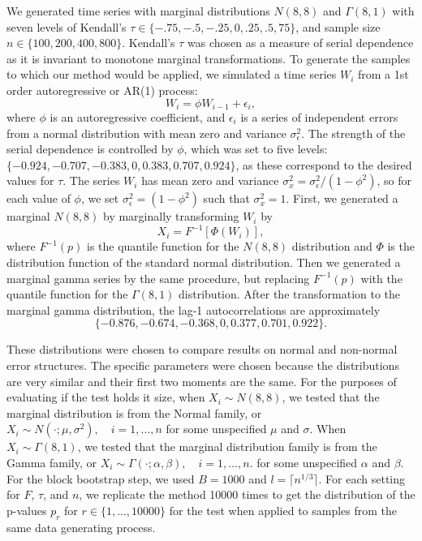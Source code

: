 \documentclass[APA,Times1COL]{WileyNJDv5} %
\begin{document}
We generated time series with marginal distributions $N(8, 8)$ and
$\Gamma(8, 1)$ with seven levels of Kendall's
$\tau \in \{-.75, -.5, -.25, 0, .25, .5, 75\}$, and
sample size $n \in \{100, 200, 400, 800\}$. Kendall's $\tau$ was chosen as a
measure of serial dependence as it is invariant to monotone marginal
transformations. 
To generate the samples to which our
method would be applied, we simulated a time series $W_i$ from a 1st 
order autoregressive or AR(1) process:
\begin{equation*}
W_i = \phi W_{i-1} + \epsilon_i,
\end{equation*}
where $\phi$ is an autoregressive coefficient, and $\epsilon_i$ is a series of
independent errors from a normal distribution with mean zero and variance
$\sigma_{\epsilon}^2$. The strength of the serial dependence is controlled by
$\phi$, which was set to five levels: 
$\{-0.924, -0.707, -0.383, 0, 0.383, 0.707, 0.924\}$, as these
correspond to the desired values for $\tau$. The 
series $W_i$ has mean zero and variance 
$\sigma_x^2 = \sigma_{\epsilon}^2 / (1 - \phi^2)$, so for each value of
$\phi$,  we 
set $\sigma_{\epsilon}^2 = (1 - \phi^2)$ such that $\sigma_x^2 = 1$.
First, we generated a
marginal $N(8, 8)$ by marginally transforming $W_i$ by
\begin{equation*}
X_i = F^{-1}[\Phi(W_i)],
\end{equation*}
where $F^{-1}(p)$ is the quantile function for the $N(8, 8)$ 
distribution and $\Phi$ is the distribution function of the standard normal
distribution.
Then we generated a marginal gamma series by the same procedure, but
replacing $F^{-1}(p)$ with the quantile function for the $\Gamma(8, 1)$
distribution.
After the transformation
to the marginal gamma distribution, the lag-1 autocorrelations are approximately
\[
  \{-0.876, -0.674, -0.368, 0, 0.377, 0.701, 0.922\}.
\]


These distributions
were chosen to compare results on normal and non-normal
error structures. The specific parameters were chosen because the distributions 
are very similar and their
first two moments are the same. 
For the purposes of 
evaluating if the test holds it size, when $X_i \sim N(8, 8)$, we tested that the 
marginal distribution is from the
Normal family, or 
$X_i \sim N(\cdot ; \mu, \sigma^2), \quad i = 1, \ldots, n$
for some unspecified $\mu$ and $\sigma$. When $X_i \sim \Gamma(8, 1)$, we tested
that the marginal distribution family is from the Gamma family,
or
$X_i \sim \Gamma(\cdot ; \alpha, \beta), \quad i = 1, \ldots, n$.
for some unspecified $\alpha$ and $\beta$. For the block bootstrap step,
we used $B = 1000$ and $l = \lceil n^{1/3} \rceil$.
For each setting for $F$, $\tau$, and $n$, we replicate the method 10000 times 
to get the distribution of the p-values $p_r$ for
$r \in \{1, \dots, 10000\}$
for the test when applied to samples from the same data generating process.
\end{document}
